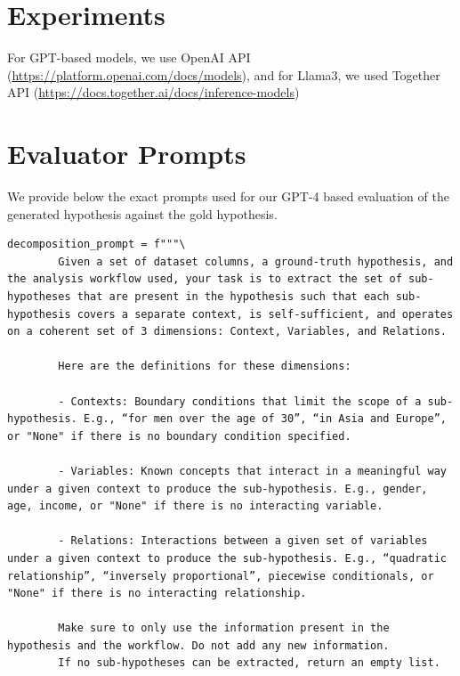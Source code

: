 \section{Experiments}
\label{app:exp}
For GPT-based models, we use OpenAI API (\url{https://platform.openai.com/docs/models}), and for Llama3, we used Together API (\url{https://docs.together.ai/docs/inference-models})

\section{Evaluator Prompts}
\label{app:evaluation-prompts}

We provide below the exact prompts used for our GPT-4 based evaluation of the generated hypothesis against the gold hypothesis.

\begin{listing}[!ht]
\begin{verbatim}
decomposition_prompt = f"""\
        Given a set of dataset columns, a ground-truth hypothesis, and the analysis workflow used, your task is to extract the set of sub-hypotheses that are present in the hypothesis such that each sub-hypothesis covers a separate context, is self-sufficient, and operates on a coherent set of 3 dimensions: Context, Variables, and Relations.
        
        Here are the definitions for these dimensions:
        
        - Contexts: Boundary conditions that limit the scope of a sub-hypothesis. E.g., “for men over the age of 30”, “in Asia and Europe”, or "None" if there is no boundary condition specified.
        
        - Variables: Known concepts that interact in a meaningful way under a given context to produce the sub-hypothesis. E.g., gender, age, income, or "None" if there is no interacting variable.
        
        - Relations: Interactions between a given set of variables under a given context to produce the sub-hypothesis. E.g., “quadratic relationship”, “inversely proportional”, piecewise conditionals, or "None" if there is no interacting relationship. 
        
        Make sure to only use the information present in the hypothesis and the workflow. Do not add any new information.
        If no sub-hypotheses can be extracted, return an empty list.


\end{verbatim}
\end{listing}
